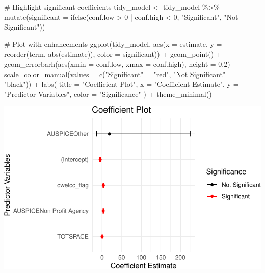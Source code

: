 \documentclass[
  letterpaper,
  DIV=11,
  numbers=noendperiod]{scrartcl}
\newenvironment{Shaded}{\begin{snugshade}}{\end{snugshade}}
\newcommand{\AttributeTok}[1]{\textcolor[rgb]{0.40,0.45,0.13}{#1}}
\newcommand{\CommentTok}[1]{\textcolor[rgb]{0.37,0.37,0.37}{#1}}
\newcommand{\DecValTok}[1]{\textcolor[rgb]{0.68,0.00,0.00}{#1}}
\newcommand{\FloatTok}[1]{\textcolor[rgb]{0.68,0.00,0.00}{#1}}
\newcommand{\FunctionTok}[1]{\textcolor[rgb]{0.28,0.35,0.67}{#1}}
\newcommand{\NormalTok}[1]{\textcolor[rgb]{0.00,0.23,0.31}{#1}}
\newcommand{\OtherTok}[1]{\textcolor[rgb]{0.00,0.23,0.31}{#1}}
\newcommand{\SpecialCharTok}[1]{\textcolor[rgb]{0.37,0.37,0.37}{#1}}
\newcommand{\StringTok}[1]{\textcolor[rgb]{0.13,0.47,0.30}{#1}}
\begin{document}
\begin{Shaded}
\begin{Highlighting}[]
\CommentTok{\# Highlight significant coefficients}
\NormalTok{tidy\_model }\OtherTok{\textless{}{-}}\NormalTok{ tidy\_model }\SpecialCharTok{\%\textgreater{}\%}
  \FunctionTok{mutate}\NormalTok{(}\AttributeTok{significant =} \FunctionTok{ifelse}\NormalTok{(conf.low }\SpecialCharTok{\textgreater{}} \DecValTok{0} \SpecialCharTok{|}\NormalTok{ conf.high }\SpecialCharTok{\textless{}} \DecValTok{0}\NormalTok{, }\StringTok{"Significant"}\NormalTok{, }\StringTok{"Not Significant"}\NormalTok{))}

\CommentTok{\# Plot with enhancements}
\FunctionTok{ggplot}\NormalTok{(tidy\_model, }\FunctionTok{aes}\NormalTok{(}\AttributeTok{x =}\NormalTok{ estimate, }\AttributeTok{y =} \FunctionTok{reorder}\NormalTok{(term, }\FunctionTok{abs}\NormalTok{(estimate)), }\AttributeTok{color =}\NormalTok{ significant)) }\SpecialCharTok{+}
  \FunctionTok{geom\_point}\NormalTok{() }\SpecialCharTok{+}
  \FunctionTok{geom\_errorbarh}\NormalTok{(}\FunctionTok{aes}\NormalTok{(}\AttributeTok{xmin =}\NormalTok{ conf.low, }\AttributeTok{xmax =}\NormalTok{ conf.high), }\AttributeTok{height =} \FloatTok{0.2}\NormalTok{) }\SpecialCharTok{+}
  \FunctionTok{scale\_color\_manual}\NormalTok{(}\AttributeTok{values =} \FunctionTok{c}\NormalTok{(}\StringTok{"Significant"} \OtherTok{=} \StringTok{"red"}\NormalTok{, }\StringTok{"Not Significant"} \OtherTok{=} \StringTok{"black"}\NormalTok{)) }\SpecialCharTok{+}
  \FunctionTok{labs}\NormalTok{(}
    \AttributeTok{title =} \StringTok{"Coefficient Plot"}\NormalTok{,}
    \AttributeTok{x =} \StringTok{"Coefficient Estimate"}\NormalTok{,}
    \AttributeTok{y =} \StringTok{"Predictor Variables"}\NormalTok{,}
    \AttributeTok{color =} \StringTok{"Significance"}
\NormalTok{  ) }\SpecialCharTok{+}
  \FunctionTok{theme\_minimal}\NormalTok{()}
\end{Highlighting}
\end{Shaded}

\includegraphics{paper_files/figure-pdf/unnamed-chunk-16-1.pdf}
\end{document}
